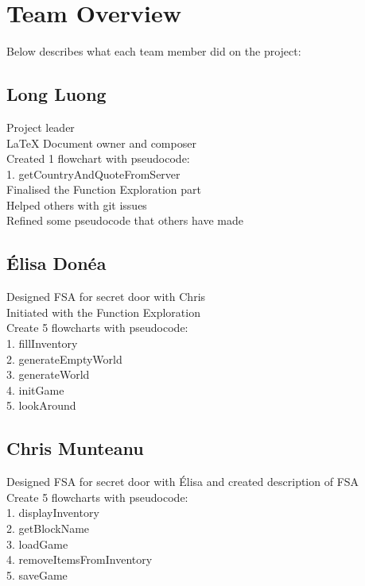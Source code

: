 \section{Team Overview} \label{section: overview}
Below describes what each team member did on the project:

\subsection{Long Luong} 
Project leader \\
LaTeX Document owner and composer \\
Created 1 flowchart with pseudocode: \\
1. getCountryAndQuoteFromServer \\
Finalised the Function Exploration part \\
Helped others with git issues \\
Refined some pseudocode that others have made

\subsection{Élisa Donéa}

Designed FSA for secret door with Chris \\
Initiated with the Function Exploration \\
Create 5 flowcharts with pseudocode: \\
1. fillInventory \\
2. generateEmptyWorld \\
3. generateWorld \\
4. initGame \\
5. lookAround \\

\subsection{Chris Munteanu}

Designed FSA for secret door with Élisa and created description of FSA \\
Create 5 flowcharts with pseudocode: \\
1. displayInventory \\
2. getBlockName \\
3. loadGame \\
4. removeItemsFromInventory \\
5. saveGame \\

